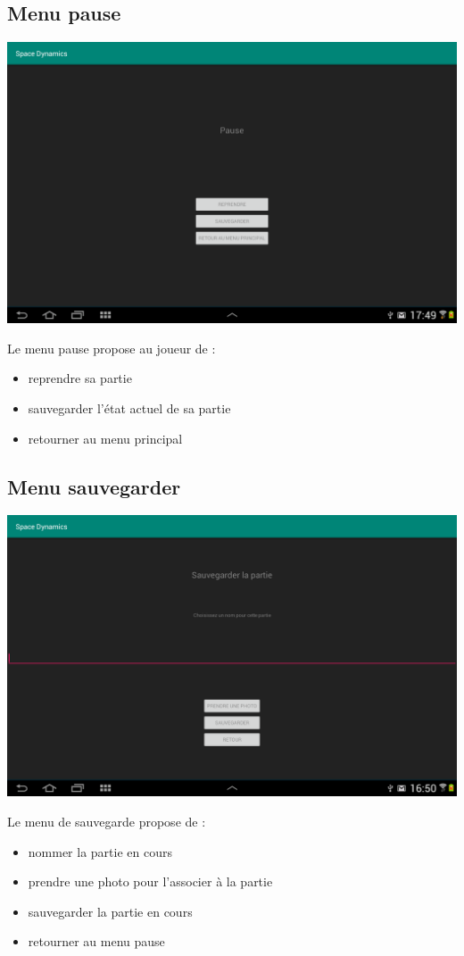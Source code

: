 \documentclass{article}
\begin{document}
\subsection{Menu pause}
\begin{center}
\includegraphics[scale=0.25]{PauseActivity.png}
\end{center}
Le menu pause propose au joueur de : 
\begin{itemize}
\item reprendre sa partie
\item sauvegarder l'état actuel de sa partie
\item retourner au menu principal
\end{itemize}

\subsection{Menu sauvegarder}
\begin{center}
\includegraphics[scale=0.25]{SaveGameActivity.png}
\end{center}
Le menu de sauvegarde propose de :
\begin{itemize}
\item nommer la partie en cours
\item prendre une photo pour l’associer à la partie
\item sauvegarder la partie en cours
\item retourner au menu pause
\end{itemize}
\end{document}
